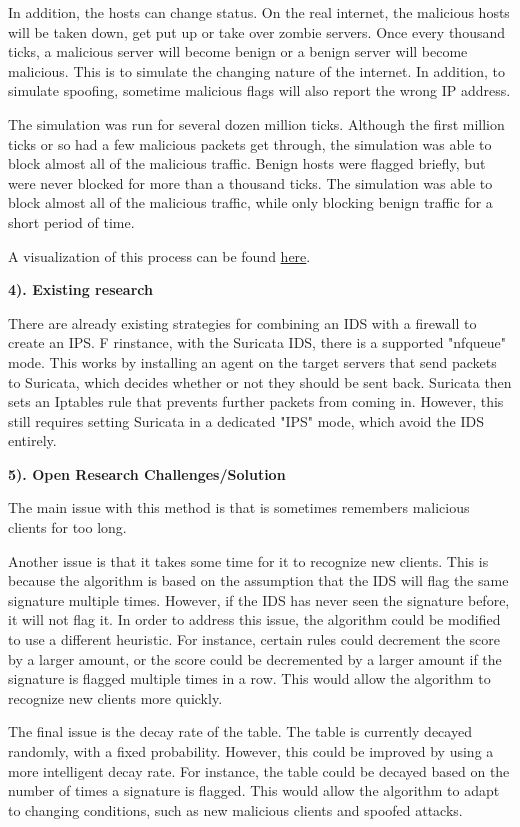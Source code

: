 \documentclass[12pt]{article}
\begin{document}
\begin{flushleft}
\begin{multicols}{2}
In addition, the hosts can change status. On the real internet, the malicious hosts will be taken down, get put up or take over zombie servers. Once every thousand ticks, a malicious server will become benign or a benign server will become malicious. This is to simulate the changing nature of the internet. In addition, to simulate spoofing, sometime malicious flags will also report the wrong IP address.

The simulation was run for several dozen million ticks. Although the first million ticks or so had a few malicious packets get through, the simulation was able to block almost all of the malicious traffic. Benign hosts were flagged briefly, but were never blocked for more than a thousand ticks. The simulation was able to block almost all of the malicious traffic, while only blocking benign traffic for a short period of time.

A visualization of this process can be found \href{https://youtu.be/-2nSqtbwnJU}{here}.

\textbf{4). Existing research}

There are already existing strategies for combining an IDS with a firewall to create an IPS. F rinstance, with the Suricata IDS, there is a supported "nfqueue" mode. This works by installing an agent on the target servers that send packets to Suricata, which decides whether or not they should be sent back. Suricata then sets an Iptables rule that prevents further packets from coming in. However, this still requires setting Suricata in a dedicated "IPS" mode, which avoid the IDS entirely.

\textbf{5). Open Research Challenges/Solution}

The main issue with this method is that is sometimes remembers malicious clients for too long.

Another issue is that it takes some time for it to recognize new clients. This is because the algorithm is based on the assumption that the IDS will flag the same signature multiple times. However, if the IDS has never seen the signature before, it will not flag it. In order to address this issue, the algorithm could be modified to use a different heuristic. For instance, certain rules could decrement the score by a larger amount, or the score could be decremented by a larger amount if the signature is flagged multiple times in a row. This would allow the algorithm to recognize new clients more quickly.

The final issue is the decay rate of the table. The table is currently decayed randomly, with a fixed probability. However, this could be improved by using a more intelligent decay rate. For instance, the table could be decayed based on the number of times a signature is flagged. This would allow the algorithm to adapt to changing conditions, such as new malicious clients and spoofed attacks.


\end{multicols}
\end{flushleft}
\end{document}
